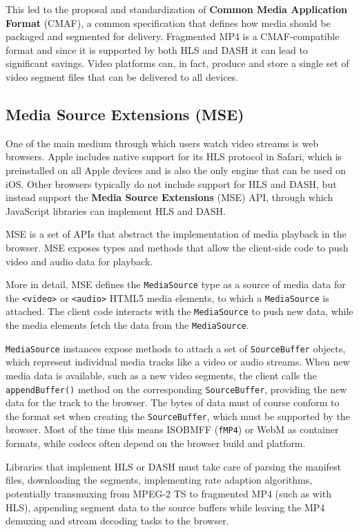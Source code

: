 This led to the proposal and standardization of \textbf{Common Media Application Format} (CMAF), a common specification that defines how media should be packaged and segmented for delivery. Fragmented MP4 is a CMAF-compatible format and since it is supported by both HLS and DASH it can lead to significant savings. Video platforms can, in fact, produce and store a single set of video segment files that can be delivered to all devices.\cite{cmaf}

\subsection{Media Source Extensions (MSE)}
\label{sec:bg/technologies/mse}

One of the main medium through which users watch video streams is web browsers. Apple includes native support for its HLS protocol in Safari, which is preinstalled on all Apple devices and is also the only engine that can be used on iOS. Other browsers typically do not include support for HLS and DASH, but instead support the \textbf{Media Source Extensions} (MSE) API, through which JavaScript libraries can implement HLS and DASH.\cite{mse}

MSE is a set of APIs that abstract the implementation of media playback in the browser. MSE exposes types and methods that allow the client-side code to push video and audio data for playback.

More in detail, MSE defines the \texttt{MediaSource} type as a source of media data for the \texttt{<video>} or \texttt{<audio>} HTML5 media elements, to which a \texttt{MediaSource} is attached. The client code interacts with the \texttt{MediaSource} to push new data, while the media elements fetch the data from the \texttt{MediaSource}.

\texttt{MediaSource} instances expose methods to attach a set of \texttt{SourceBuffer} objects, which represent individual media tracks like a video or audio streams. When new media data is available, such as a new video segments, the client calls the \texttt{appendBuffer()} method on the corresponding \texttt{SourceBuffer}, providing the new data for the track to the browser. The bytes of data must of course conform to the format set when creating the \texttt{SourceBuffer}, which must be supported by the browser. Most of the time this means ISOBMFF (\texttt{fMP4}) or WebM as container formats, while codecs often depend on the browser build and platform.

Libraries that implement HLS or DASH must take care of parsing the manifest files, downloading the segments, implementing rate adaption algorithms, potentially transmuxing from MPEG-2 TS to fragmented MP4 (such as with HLS), appending segment data to the source buffers while leaving the MP4 demuxing and stream decoding tasks to the browser.

